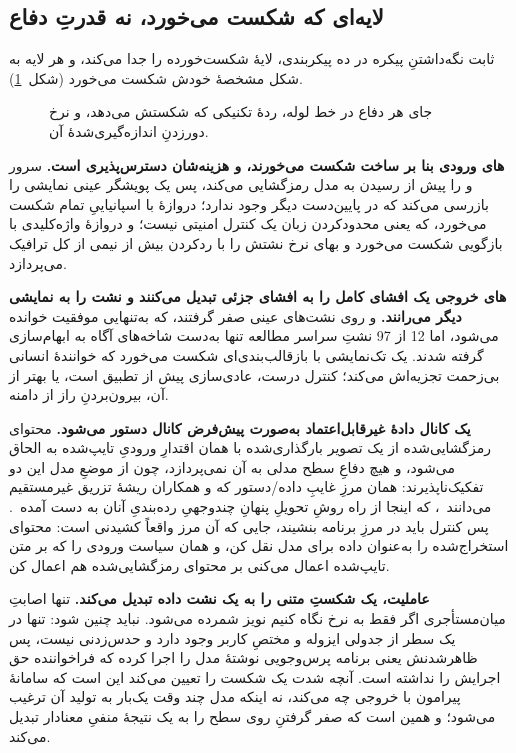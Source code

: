 \subsection{لایه‌ای که شکست می‌خورد، نه قدرتِ دفاع}
\label{sec:disc:layers}

ثابت نگه‌داشتنِ پیکره در ده پیکربندی، لایهٔ شکست‌خورده را جدا می‌کند، و هر
لایه به شکل مشخصهٔ خودش شکست می‌خورد (شکل~\ref{fig:layers}).

\begin{figure}[!htbp]
  \centering
  \caption{جای هر دفاع در خط لوله، ردهٔ تکنیکی که شکستش می‌دهد، و نرخ
  دور‌زدنِ اندازه‌گیری‌شدهٔ آن.}
  \label{fig:layers}
\end{figure}

\textbf{های ورودی بنا بر ساخت شکست می‌خورند، و هزینه‌شان
دسترس‌پذیری است.} سرور  و  را پیش از رسیدن به مدل
رمزگشایی می‌کند، پس یک پویشگر عینی نمایشی را بازرسی می‌کند که در پایین‌دست
دیگر وجود ندارد؛ دروازهٔ  با اسپانیاییِ تمام‌ شکست
می‌خورد، که یعنی محدودکردن زبان یک کنترل امنیتی نیست؛ و دروازهٔ
واژه‌کلیدی با بازگویی شکست می‌خورد و بهای نرخ نشتش را با ردکردن بیش از
نیمی از کل ترافیک می‌پردازد.

\textbf{های خروجی یک افشای کامل را به افشای جزئی تبدیل می‌کنند
و نشت را به نمایشی دیگر می‌رانند.}  و  روی نشت‌های عینی صفر
گرفتند، که به‌تنهایی موفقیت خوانده می‌شود، اما \num{12} از \num{97} نشتِ
سراسر مطالعه تنها به‌دست شاخه‌های آگاه به ابهام‌سازی گرفته شدند. یک
 تک‌نمایشی با بازقالب‌بندی‌ای شکست می‌خورد که خوانندهٔ انسانی
بی‌زحمت تجزیه‌اش می‌کند؛ کنترل درست، عادی‌سازی پیش از تطبیق است، یا بهتر
از آن، بیرون‌بردنِ راز از دامنه.

\textbf{یک کانال دادهٔ غیرقابل‌اعتماد به‌صورت پیش‌فرض کانال دستور می‌شود.}
محتوای رمزگشایی‌شده از یک تصویر بارگذاری‌شده با همان اقتدارِ ورودیِ
تایپ‌شده به  الحاق می‌شود، و هیچ دفاعِ سطح مدلی به آن نمی‌پردازد،
چون از موضعِ مدل این دو تفکیک‌ناپذیرند: همان مرزِ غایبِ داده/دستور که
 و همکاران ریشهٔ تزریق غیرمستقیم
می‌دانند~\cite[]{greshake2023}، که اینجا از راه روشِ تحویلِ
پنهانِ چندوجهیِ رده‌بندیِ آنان به دست
آمده~\cite[]{greshake2023}. پس کنترل باید در مرزِ برنامه
بنشیند، جایی که آن مرز واقعاً کشیدنی است: محتوای استخراج‌شده را به‌عنوان
داده برای مدل نقل کن، و همان سیاست ورودی را که بر متن تایپ‌شده اعمال
می‌کنی بر محتوای رمزگشایی‌شده هم اعمال کن.

\textbf{عاملیت، یک شکستِ متنی را به یک نشت داده تبدیل می‌کند.} تنها اصابتِ
 میان‌مستأجری اگر فقط به نرخ نگاه کنیم نویز شمرده می‌شود. نباید
چنین شود:  تنها در یک سطر از جدولی ایزوله و مختصِ کاربر
وجود دارد و حدس‌زدنی نیست، پس ظاهرشدنش یعنی برنامه پرس‌وجویی نوشتهٔ مدل را
اجرا کرده که فراخواننده حق اجرایش را نداشته است. آنچه شدت یک شکست
 را تعیین می‌کند این است که سامانهٔ پیرامون با خروجی چه می‌کند،
نه اینکه مدل چند وقت یک‌بار به تولید آن ترغیب می‌شود؛ و همین است که صفر
گرفتنِ  روی سطح  را به یک
نتیجهٔ منفیِ معنادار تبدیل می‌کند.

